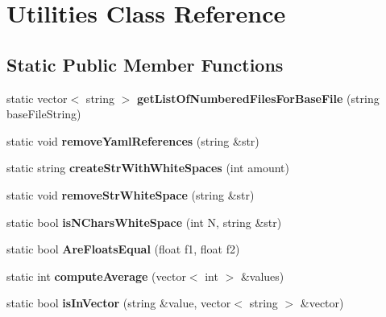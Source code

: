 \hypertarget{classUtilities}{}\section{Utilities Class Reference}
\label{classUtilities}
\subsection*{Static Public Member Functions}
\begin{DoxyCompactItemize}
\item 
\mbox{\label{classUtilities_a6b05484ec7d0d5a71f4ccd775f20a5c2}} 
static vector$<$ string $>$ {\bfseries get\+List\+Of\+Numbered\+Files\+For\+Base\+File} (string base\+File\+String)
\item 
\mbox{\label{classUtilities_a6a2654b7cbbc430b17d42e520159b91e}} 
static void {\bfseries remove\+Yaml\+References} (string \&str)
\item 
\mbox{\label{classUtilities_ac8923fd8433ca415a895a2298a03a2e7}} 
static string {\bfseries create\+Str\+With\+White\+Spaces} (int amount)
\item 
\mbox{\label{classUtilities_af0943918d7b3643596ab93ea8333894f}} 
static void {\bfseries remove\+Str\+White\+Space} (string \&str)
\item 
\mbox{\label{classUtilities_a87920ab569865b8fdb87bc2484ba0fb3}} 
static bool {\bfseries is\+N\+Chars\+White\+Space} (int N, string \&str)
\item 
\mbox{\label{classUtilities_a6eb13a9d34f53096f88579523c766a70}} 
static bool {\bfseries Are\+Floats\+Equal} (float f1, float f2)
\item 
\mbox{\label{classUtilities_a64040506330ee0342c7ffafbeef76e41}} 
static int {\bfseries compute\+Average} (vector$<$ int $>$ \&values)
\item 
\mbox{\label{classUtilities_a32fc9c952880eff1d83929f4b42e75e0}} 
static bool {\bfseries is\+In\+Vector} (string \&value, vector$<$ string $>$ \&vector)
\item 
\mbox{\label{classUtilities_ac65283ddc58535bf53f9ecc66b71cf85}} 

\end{DoxyCompactItemize}
